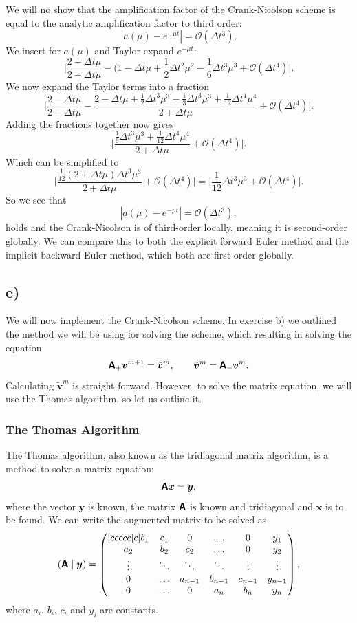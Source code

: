 \documentclass[a4paper, 11pt, notitlepage, english]{article}
\newcommand{\bt}[1]{\boldsymbol{#1}}
\newcommand{\mat}[1]{\textsf{\textbf{#1}}}
\begin{document}
We will no show that the amplification factor of the Crank-Nicolson scheme is equal to the analytic amplification factor to third order:
$$|a(\mu) - e^{-\mu t}| = \mathcal{O}(\Delta t^3).$$
We insert for $a(\mu)$ and Taylor expand $e^{-\mu t}$:
$$\bigg|\frac{2-\Delta t\mu}{2 + \Delta t\mu} - \big(1 - \Delta t \mu + \frac{1}{2}\Delta t^2 \mu^2 - \frac{1}{6}\Delta t^3 \mu^3 + \mathcal{O}(\Delta t^4) \bigg|.$$
We now expand the Taylor terms into a fraction
$$\bigg|\frac{2-\Delta t\mu}{2 + \Delta t\mu} - \frac{2-\Delta t \mu  + \frac{1}{2}\Delta t^3 \mu^3 - \frac{1}{3}\Delta t^3 \mu^3 + \frac{1}{12}\Delta t^4 \mu^4}{2+\Delta t \mu} + \mathcal{O}(\Delta t^4) \bigg|.$$
Adding the fractions together now gives
$$\bigg|\frac{\frac{1}{6}\Delta t^3 \mu^3  + \frac{1}{12}\Delta t^4 \mu^4}{2+\Delta t \mu} + \mathcal{O}(\Delta t^4) \bigg|.$$
Which can be simplified to
$$\bigg|\frac{\frac{1}{12}(2 + \Delta t \mu)\Delta t^3 \mu^3}{2+\Delta t \mu} + \mathcal{O}(\Delta t^4) \bigg| = \bigg|\frac{1}{12}\Delta t^3 \mu^3 + \mathcal{O}(\Delta t^4)\bigg|.$$
So we see that
$$|a(\mu) - e^{-\mu t}| = \mathcal{O}(\Delta t^3),$$
holds and the Crank-Nicolson is of third-order locally, meaning it is second-order globally. We can compare this to both the explicit forward Euler method and the implicit backward Euler method, which both are first-order globally.

\clearpage

\subsection*{e)}
We will now implement the Crank-Nicolson scheme. In exercise b) we outlined the method we will be using for solving the scheme, which resulting in solving the equation
$$\mat{A}_+ \bt{v}^{m+1} = \bt{\tilde{v}}^m, \qquad \bt{\tilde{v}}^m = \mat{A}_- \bt{v}^m.$$
Calculating 
$\bt{\tilde{v}}^m$
 is straight forward.
However, to solve the matrix equation, we will use the Thomas algorithm, so let us outline it.

\subsubsection*{The Thomas Algorithm}
The Thomas algorithm, also known as the tridiagonal matrix algorithm, is a method to solve a matrix equation:
$$\mat{A}\bt{x} = \bt{y},$$
where the vector $\bt{y}$ is known, the matrix $\mat{A}$ is known and tridiagonal and $\bt{x}$ is to be found. We can write the augmented matrix to be solved as
$$ \left(\mat{A} \mid \bt{y} \right) = 
\begin{pmatrix}[ccccc|c]
b_1 & c_1 &  0 &   \ldots & 0 & {y}_1 \\
a_2 &  b_2 & c_2 &  \ldots & 0 & {y}_2\\
\vdots & \ddots &  \ddots & \ddots & \vdots & \vdots\\
0 & \ldots &  a_{n-1} & b_{n-1} & c_{n-1} & y_{n-1}\\
0 & \ldots &  0 & a_n & b_n & y_n
\end{pmatrix},
$$
where $a_i$, $b_i$, $c_i$ and $y_i$ are constants.
\end{document}
